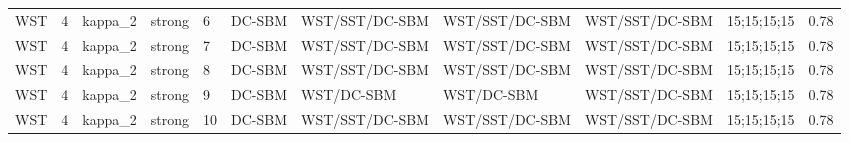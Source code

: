 \begin{table}[!h]
\begin{tabular}[t]{lllllllllll}
WST & 4 & kappa_2 & strong & 6 & DC-SBM & WST/SST/DC-SBM & WST/SST/DC-SBM & WST/SST/DC-SBM & 15;15;15;15 & 0.78\\
WST & 4 & kappa_2 & strong & 7 & DC-SBM & WST/SST/DC-SBM & WST/SST/DC-SBM & WST/SST/DC-SBM & 15;15;15;15 & 0.78\\
WST & 4 & kappa_2 & strong & 8 & DC-SBM & WST/SST/DC-SBM & WST/SST/DC-SBM & WST/SST/DC-SBM & 15;15;15;15 & 0.78\\
WST & 4 & kappa_2 & strong & 9 & DC-SBM & WST/DC-SBM & WST/DC-SBM & WST/SST/DC-SBM & 15;15;15;15 & 0.78\\
WST & 4 & kappa_2 & strong & 10 & DC-SBM & WST/SST/DC-SBM & WST/SST/DC-SBM & WST/SST/DC-SBM & 15;15;15;15 & 0.78\\
\bottomrule
\end{tabular}
\end{table}
